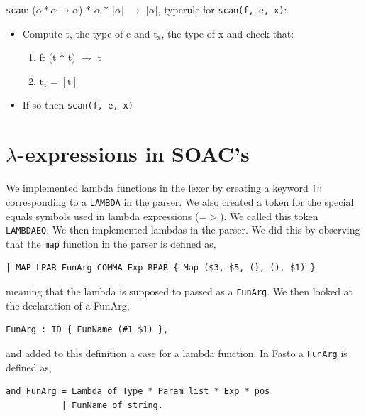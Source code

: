 \documentclass[11pt]{article}
\begin{document}
    \texttt{scan}: ($\alpha \ast \alpha \rightarrow \alpha$) $\ast$ $\alpha$
    $\ast$ [$\alpha$] $\rightarrow$ [$\alpha$], typerule for
    \texttt{scan(f, e, x)}:
    \vspace{-2.5mm}
    \begin{itemize}[noitemsep]
        \item Compute t, the type of e and $\text{t}_\text{x}$, the type of x
            and check that:
        	\begin{enumerate}[noitemsep]
        	   \item f: (t $\ast$ t) $\rightarrow$ t
        	   \item $\text{t}_\text{x} = [\text{t}]$
    		\end{enumerate}
        \item If so then \texttt{scan(f, e, x)}
    \end{itemize}

    \section{$\lambda$-expressions in SOAC's}
    We implemented lambda functions in the lexer by creating a keyword
    \texttt{fn} corresponding to a \texttt{LAMBDA} in the parser.  We also
    created a token for the special equals symbols used in lambda expressions
    (=$>$).  We called this token \texttt{LAMBDAEQ}.  We then implemented lambdas
    in the parser.  We did this by observing that the \texttt{map} function in
    the parser is defined as,

    \begin{lstlisting}[basicstyle=\small]
| MAP LPAR FunArg COMMA Exp RPAR { Map ($3, $5, (), (), $1) }
    \end{lstlisting}

    meaning that the lambda is supposed to passed as a \texttt{FunArg}.  We then
    looked at the declaration of a FunArg,

    \begin{lstlisting}[basicstyle=\small]
FunArg : ID { FunName (#1 $1) },
    \end{lstlisting}

    and added to this definition a case for a lambda function.  In Fasto a
    \texttt{FunArg} is defined as,

    \begin{lstlisting}[basicstyle=\small]
and FunArg = Lambda of Type * Param list * Exp * pos
           | FunName of string.
    \end{lstlisting}
\end{document}
